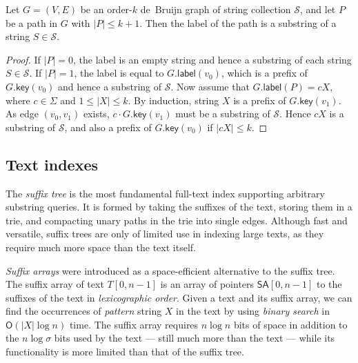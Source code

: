 \documentclass[a4paper,UKenglish]{lipics-v2016}
\newcommand{\abs}[1]{\ensuremath{\lvert #1 \rvert}}
\newcommand{\Oh}[1]{\ensuremath{\mathsf{O}\!\left( #1 \right)}}
\newcommand{\glabel}{\ensuremath{\mathsf{label}}}
\newcommand{\gkey}{\ensuremath{\mathsf{key}}}
\newcommand{\orderk}[1]{order\nobreakdash-$#1$}
\newcommand{\SA}{\ensuremath{\mathsf{SA}}}
\begin{document}
\begin{lemma}[No false positives with $\abs{P} \le k+1$]\label{lemma:dbg-fp}
Let $G = (V, E)$ be an \orderk{k} de~Bruijn graph of string collection $\mathcal{S}$, and let $P$ be a path in $G$ with $\abs{P} \le k+1$. Then the label of the path is a substring of a string $S \in \mathcal{S}$.
\end{lemma}

\begin{proof}
If $\abs{P} = 0$, the label is an empty string and hence a substring of each string $S \in \mathcal{S}$. If $\abs{P} = 1$, the label is equal to $G.\glabel(v_{0})$, which is a prefix of $G.\gkey(v_{0})$ and hence a substring of $\mathcal{S}$. Now assume that $G.\glabel(P) = cX$, where $c \in \Sigma$ and $1 \le \abs{X} \le k$. By induction, string $X$ is a prefix of $G.\gkey(v_{1})$. As edge $(v_{0}, v_{1})$ exists, $c \cdot G.\gkey(v_{1})$ must be a substring of $\mathcal{S}$. Hence $cX$ is a substring of $\mathcal{S}$, and also a prefix of $G.\gkey(v_{0})$ if $\abs{cX} \le k$.
\end{proof}

\subsection{Text indexes}

The \emph{suffix tree} \cite{Weiner1973} is the most fundamental full-text index supporting arbitrary substring queries. It is formed by taking the suffixes of the text, storing them in a trie, and compacting unary paths in the trie into single edges. Although fast and versatile, suffix trees are only of limited use in indexing large texts, as they require much more space than the text itself.

\emph{Suffix arrays} \cite{Manber1993} were introduced as a space-efficient alternative to the suffix tree. The suffix array of text $T[0, n-1]$ is an array of pointers $\SA[0, n-1]$ to the suffixes of the text in \emph{lexicographic order}. Given a text and its suffix array, we can find the occurrences of \emph{pattern} string $X$ in the text by using \emph{binary search} in $\Oh{\abs{X} \log n}$ time. The suffix array requires $n \log n$ bits of space in addition to the $n \log \sigma$ bits used by the text --- still much more than the text --- while its functionality is more limited than that of the suffix tree.
\end{document}
